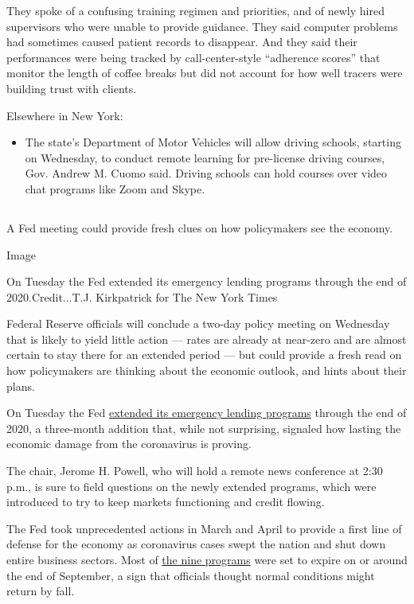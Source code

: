 They spoke of a confusing training regimen and priorities, and of newly
hired supervisors who were unable to provide guidance. They said
computer problems had sometimes caused patient records to disappear. And
they said their performances were being tracked by call-center-style
``adherence scores'' that monitor the length of coffee breaks but did
not account for how well tracers were building trust with clients.

Elsewhere in New York:

\begin{itemize}
\tightlist
\item
  The state's Department of Motor Vehicles will allow driving schools,
  starting on Wednesday, to conduct remote learning for pre-license
  driving courses, Gov. Andrew M. Cuomo said. Driving schools can hold
  courses over video chat programs like Zoom and Skype.
\end{itemize}

\hypertarget{-10}{%
\subsection{}\label{-10}}

A Fed meeting could provide fresh clues on how policymakers see the
economy.

Image

On Tuesday the Fed extended its emergency lending programs through the
end of 2020.Credit...T.J. Kirkpatrick for The New York Times

Federal Reserve officials will conclude a two-day policy meeting on
Wednesday that is likely to yield little action --- rates are already at
near-zero and are almost certain to stay there for an extended period
--- but could provide a fresh read on how policymakers are thinking
about the economic outlook, and hints about their plans.

On Tuesday the Fed
\href{https://www.nytimes.com/2020/07/28/business/economy/coronavirus-federal-reserve-policy.html}{extended
its emergency lending programs} through the end of 2020, a three-month
addition that, while not surprising, signaled how lasting the economic
damage from the coronavirus is proving.

The chair, Jerome H. Powell, who will hold a remote news conference at
2:30 p.m., is sure to field questions on the newly extended programs,
which were introduced to try to keep markets functioning and credit
flowing.

The Fed took unprecedented actions in March and April to provide a first
line of defense for the economy as coronavirus cases swept the nation
and shut down entire business sectors. Most of
\href{https://www.nytimes.com/2020/03/23/business/economy/coronavirus-fed-bond-buying.html}{the
nine programs} were set to expire on or around the end of September, a
sign that officials thought normal conditions might return by fall.

